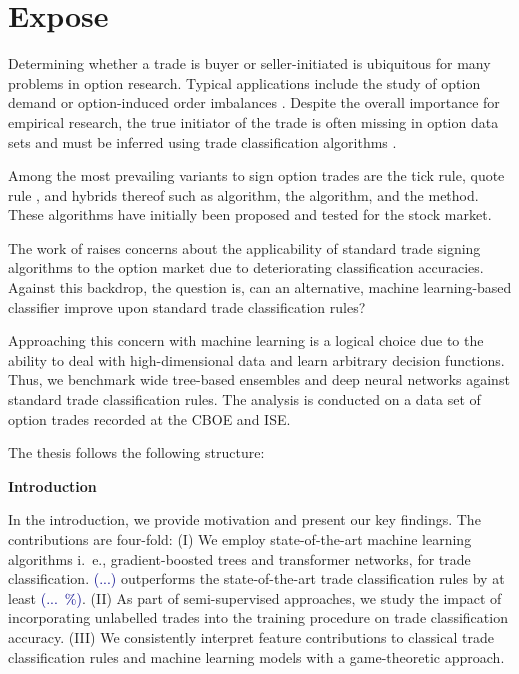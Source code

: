 \section{Expose}
\label{sec:expose}

Determining whether a trade is buyer or seller-initiated is ubiquitous for many problems in option research. Typical applications include the study of option demand \autocite{garleanuDemandBasedOptionPricing2009} or option-induced order imbalances \autocite{huDoesOptionTrading2014}. Despite the overall importance for empirical research, the true initiator of the trade is often missing in option data sets and must be inferred using trade classification algorithms \autocite{easleyOptionVolumeStock1998}. 

Among the most prevailing variants to sign option trades are the tick rule, quote rule \autocite{hasbrouckTradesQuotesInventories1988}, and hybrids thereof such as \autocite[LR,][]{leeInferringTradeDirection1991} algorithm, the \autocite[EMO,][]{ellisAccuracyTradeClassification2000} algorithm, and the  \autocite[CLVN,][]{chakrabartyTradeClassificationAlgorithms2007} method. These algorithms have initially been proposed and tested for the stock market.

The work of \textcites{grauerOptionTradeClassification2022}{savickasInferringDirectionOption2003} raises concerns about the applicability of standard trade signing algorithms to the option market due to deteriorating classification accuracies. Against this backdrop, the question is, can an alternative, machine learning-based classifier improve upon standard trade classification rules? 

Approaching this concern with machine learning is a logical choice due to the ability to deal with high-dimensional data and learn arbitrary decision functions. Thus, we benchmark wide tree-based ensembles and deep neural networks against standard trade classification rules. The analysis is conducted on a data set of option trades recorded at the \gls{CBOE} and \gls{ISE}.

The thesis follows the following structure:

\textbf{Introduction}

In the introduction, we provide motivation and present our key findings. The contributions are four-fold: (I) We employ state-of-the-art machine learning algorithms i.~e., gradient-boosted trees and transformer networks, for trade classification. \textcolor{darkblue}{(...)} outperforms the state-of-the-art trade classification rules by at least \textcolor{darkblue}{(...~\%)}. (II) As part of semi-supervised approaches, we study the impact of incorporating unlabelled trades into the training procedure on trade classification accuracy. (III) We consistently interpret feature contributions to classical trade classification rules and machine learning models with a game-theoretic approach.

